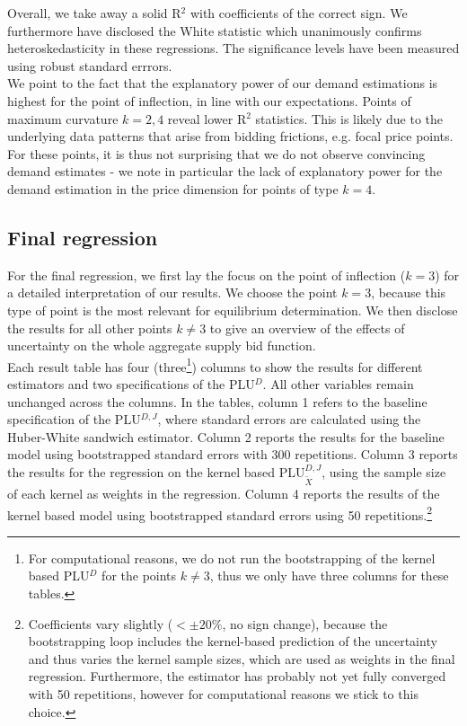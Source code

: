 Overall, we take away a solid R$^2$ with coefficients of the correct sign. We furthermore have disclosed the White statistic which unanimously confirms heteroskedasticity in these regressions. The significance levels have been measured using robust standard errrors. \\

We point to the fact that the explanatory power of our demand estimations is highest for the point of inflection, in line with our expectations. 
Points of maximum curvature $k=2,4$ reveal lower R$^2$ statistics. This is likely due to the underlying data patterns that arise from bidding frictions, e.g. focal price points. For these points, it is thus not surprising that we do not observe convincing demand estimates - we note in particular the lack of explanatory power for the demand estimation in the price dimension for points of type $k=4$. \\



\subsection{Final regression}
\label{discident}
For the final regression, we first lay the focus on the point of inflection ($k=3$) for a detailed interpretation of our results. We choose the point $k=3$, because this type of point is the most relevant for equilibrium determination.
We then disclose the results for all other points $k \neq 3$ to give an overview of the effects of uncertainty on the whole aggregate supply bid function. \\

Each result table has four (three\footnote{For computational reasons, we do not run the bootstrapping of the kernel based PLU$^D$ for the points $k\neq 3$, thus we only have three columns for these tables.}) columns to show the results for different estimators and two specifications of the PLU$^D$. All other variables remain unchanged across the columns. In the tables, column 1 refers to the baseline specification of the PLU$^{D,J}$, where standard errors are calculated using the Huber-White sandwich estimator. Column 2 reports the results for the baseline model using bootstrapped standard errors with 300 repetitions. Column 3 reports the results for the regression on the kernel based PLU$^{D,J}_{\tilde{X}}$, using the sample size of each kernel as weights in the regression. Column 4 reports the results of the kernel based model using bootstrapped standard errors using 50 repetitions.\footnote{Coefficients vary slightly ($<\pm20\%$, no sign change), because the bootstrapping loop includes the kernel-based prediction of the uncertainty and thus varies the kernel sample sizes, which are used as weights in the final regression. Furthermore, the estimator has probably not yet fully converged with 50 repetitions, however for computational reasons we stick to this choice.} \\


